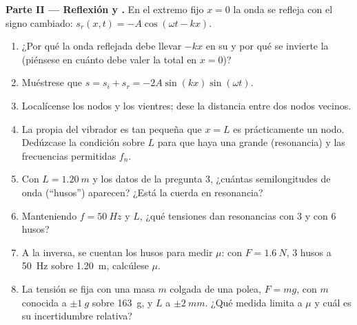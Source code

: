 \begin{problem}
\medskip
\noindent\textbf{Parte II --- Reflexión y .}
En el extremo fijo $x = 0$ la onda se refleja con el signo cambiado:
$s_r(x, t) = -A\cos(\omega t - kx)$.
\begin{enumerate}[resume]
  \item ¿Por qué la onda reflejada debe llevar $-kx$ en su  y por qué
        se invierte la  (piénsese en cuánto debe valer la 
        total en $x = 0$)?
  \item Muéstrese que $s = s_i + s_r = -2A\sin(kx)\sin(\omega t)$.
  \item Localícense los nodos y los vientres; dese la distancia entre dos
        nodos vecinos.
  \item La  propia del vibrador es tan pequeña que $x = L$ es
        prácticamente un nodo. Dedúzcase la condición sobre $L$ para que
        haya una  grande (resonancia) y las frecuencias
        permitidas $f_n$.
  \item Con $L = \qty{1.20}{m}$ y los datos de la pregunta 3, ¿cuántas
        semilongitudes de onda (``husos'') aparecen? ¿Está la cuerda en
        resonancia?
  \item Manteniendo $f = \qty{50}{Hz}$ y $L$, ¿qué tensiones dan
        resonancias con $3$ y con $6$ husos?
  \item A la inversa, se cuentan los husos para medir $\mu$: con
        $F = \qty{1.6}{N}$, $3$ husos a \qty{50}{Hz} sobre \qty{1.20}{m},
        calcúlese $\mu$.
  \item La tensión se fija con una masa $m$ colgada de una polea,
        $F = mg$, con $m$ conocida a $\pm\qty{1}{g}$ sobre \qty{163}{g}, y
        $L$ a $\pm\qty{2}{mm}$. ¿Qué medida limita a $\mu$ y cuál es su
        incertidumbre relativa?
\end{enumerate}


\end{problem}
